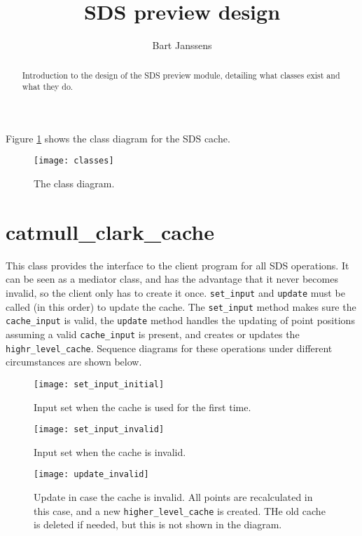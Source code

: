 \documentclass[11pt]{article} %
\title{SDS preview design}
\author{Bart Janssens}
\renewcommand{\[}{\begin{equation}}
\renewcommand{\]}{\end{equation}}
\renewcommand{\(}{\begin{displaymath}}
\renewcommand{\)}{\end{displaymath}}
\begin{document}
\maketitle
\begin{abstract}
Introduction to the design of the SDS preview module, detailing what classes exist and what they do.
\end{abstract}

Figure \ref{classes} shows the class diagram for the SDS cache.

\begin{figure}[H]
	\centering
	\texttt{[image: classes]}
	\caption{The class diagram.}
	\label{classes}
\end{figure}

\section{catmull\_clark\_cache}
This class provides the interface to the client program for all SDS operations. It can be seen as a mediator class, and has the advantage that it never becomes invalid, so the client only has to create it once. \texttt{set\_input} and \texttt{update} must be called (in this order) to update the cache. The \texttt{set\_input} method makes sure the \texttt{cache\_input} is valid, the \texttt{update} method handles the updating of point positions assuming a valid \texttt{cache\_input} is present, and creates or updates the \texttt{highr\_level\_cache}. Sequence diagrams for these operations under different circumstances are shown below.

\begin{figure}[H]
	\centering
	\texttt{[image: set\_input\_initial]}
	\caption{Input set when the cache is used for the first time.}
	\label{input_initial}
\end{figure}

\begin{figure}[H]
	\centering
	\texttt{[image: set\_input\_invalid]}
	\caption{Input set when the cache is invalid.}
	\label{input_invalid}
\end{figure}

\begin{figure}[H]
	\centering
	\texttt{[image: update\_invalid]}
	\caption{Update in case the cache is invalid. All points are recalculated in this case, and a new \texttt{higher\_level\_cache} is created. THe old cache is deleted if needed, but this is not shown in the diagram.}
	\label{update_invalid}
\end{figure}
\end{document}
